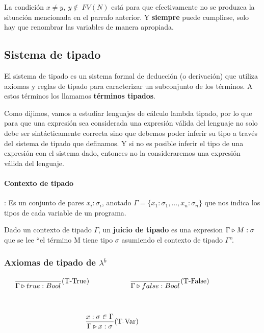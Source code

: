 La condición $x\neq y,~y\notin~FV(N)$ está para que efectivamente no se produzca la situación mencionada en el parrafo anterior. Y \textbf{siempre} puede cumplirse, solo hay que renombrar las variables de manera apropiada.

\subsection{Sistema de tipado}
El sistema de tipado es un sistema formal de deducción (o derivación) que utiliza axiomas y reglas de tipado para caracterizar un subconjunto de los términos. A estos términos los llamamos \textbf{términos tipados}.

Como dijimos, vamos a estudiar lenguajes de cálculo lambda tipado, por lo que para que una expresión sea considerada una expresión válida del lenguaje no solo debe ser sintácticamente correcta sino que debemos poder inferir su tipo a través del sistema de tipado que definamos. Y si no es posible inferir el tipo de una expresión con el sistema dado, entonces no la consideraremos una expresión válida del lenguaje.

\paragraph{Contexto de tipado}: Es un conjunto de pares $x_i:\sigma_i$, anotado $\Gamma = \{x_1:\sigma_1, \dots, x_n:\sigma_n\}$ que nos indica los tipos de cada variable de un programa.

Dado un contexto de tipado $\Gamma$, un \textbf{juicio de tipado} es una expresion $\Gamma\triangleright M : \sigma$ que se lee ``el término M tiene tipo $\sigma$ asumiendo el contexto de tipado $\Gamma$''. 

\subsubsection{Axiomas de tipado de \texorpdfstring{$\lambda^b$}{lambda b}}

\begin{equation*}
\begin{gathered}
    \frac{}{\judgeType{\Gamma}{true}{Bool}}(\text{T-True}) \hspace*{2cm} \frac{}{\judgeType{\Gamma}{false}{Bool}}(\text{T-False})\hspace*{2cm} \\
    \vspace*{5mm} \\
    \frac{x:\sigma\in\Gamma}{\judgeType{\Gamma}{x}{\sigma}}(\text{T-Var})\hspace*{2cm}
\end{gathered}
\end{equation*}

